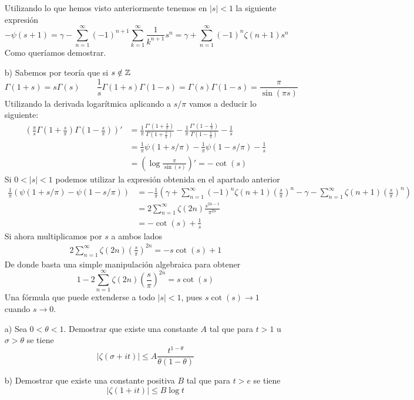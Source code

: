 \documentclass[twoside]{article}
\begin{document}
\begin{sol}
\begin{itemize}
$$$$
Utilizando lo que hemos visto anteriormente tenemos en $|s|<1$ la siguiente expresión
$$
-\psi(s+1) = \gamma -  \sum_{n=1}^\infty(-1)^{n+1}\sum_{k=1}^\infty\frac{1}{k^{n+1}}  s^n = \gamma + \sum_{n=1}^\infty(-1)^{n}\zeta(n+1) s^n
$$
Como queríamos demostrar.
\newpage
\item[b)] Sabemos por teoría que si $s\notin \mathbb{Z}$
$$\Gamma(1+s)=s\Gamma(s)  \qquad \frac{1}{s}\Gamma(1+s)\Gamma(1-s)= 	\Gamma(s)\Gamma(1-s)=\frac{\pi}{\sin(\pi s)} \qquad 
$$
Utilizando la derivada logarítmica aplicando a $s/\pi$ vamos a deducir lo siguiente:
\begin{align*}
\left(\frac{\pi}{s}\Gamma\left(1+\frac{s}{\pi}\right)\Gamma\left(1-\frac{s}{\pi}\right)\right)' & = \frac{1}{\pi}\frac{\Gamma'\left(1+\frac{s}{\pi}\right)}{\Gamma\left(1+\frac{s}{\pi}\right)} - \frac{1}{\pi}\frac{\Gamma'(1-\frac{1}{\pi})}{\Gamma(1-\frac{1}{\pi})} - \frac{1}{s}\\
 &= \frac{1}{\pi}\psi(1+s/\pi)-\frac{1}{\pi}\psi(1-s/\pi) - \frac{1}{s}\\
&=\left(\log\frac{\pi}{\sin(s)}\right)'  = -\cot(s)
\end{align*}
Si $0<|s|<1$ podemos utilizar la expresión obtenida en el apartado anterior
\begin{align*}
\frac{1}{\pi}\left(\psi(1+s/\pi)-\psi(1-s/\pi)\right) &=  -\frac{1}{\pi}\left(\gamma+ \sum_{n=1}^\infty(-1)^{n}\zeta(n+1) \left(\frac{s}{\pi}\right)^n -  \gamma - \sum_{n=1}^\infty\zeta(n+1) \left(\frac{s}{\pi}\right)^n\right)\\
&=2\sum_{n=1}^\infty \zeta(2n)\frac{s^{2n-1}}{\pi^{2n}}\\
&=-\cot(s)+\frac{1}{s}
\end{align*}
Si ahora multiplicamos por $s$ a ambos lados
\begin{gather*}
2\sum_{n=1}^\infty \zeta(2n)\left(\frac{s}{\pi}\right)^{2n}=-s\cot(s)+1 
\end{gather*}
De donde basta una simple manipulación algebraica para obtener
$$
1-2\sum_{n=1}^\infty \zeta(2n)\left(\frac{s}{\pi}\right)^{2n}=s\cot(s)
$$
Una fórmula que puede extenderse a todo $|s|<1$, pues $s\cot(s)\to 1$ cuando $s\to 0$.
\end{itemize}
\end{sol}
\newpage

\begin{ejercicio}{7}
\begin{itemize}
\item[]
\item[a)] Sea $0<\theta<1$. Demostrar que existe una constante $A$ tal que para $t>1$ u $\sigma>\theta$ se tiene
$$
|\zeta(\sigma +it)|\leq A\frac{t^{1-\theta}}{\theta(1-\theta)}
$$
\item[b)] Demostrar que existe una constante positiva $B$ tal que para $t>e$ se tiene
$$
|\zeta(1+it)|\leq B\log t
$$
\end{itemize}
\end{ejercicio}
\end{document}
